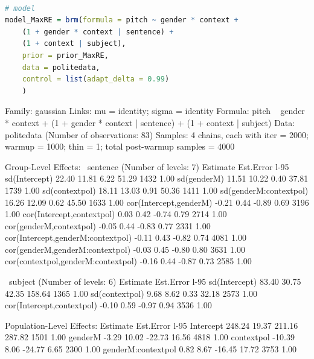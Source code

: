 \documentclass[nobib]{tufte-handout}
\begin{document}
\bigskip

\begin{minipage}[]{1\textwidth}
\begin{lstlisting}[language=R]

# model
model_MaxRE = brm(formula = pitch ~ gender * context +
	(1 + gender * context | sentence) +
	(1 + context | subject),
	prior = prior_MaxRE,
	data = politedata,
	control = list(adapt_delta = 0.99)
	)
\end{lstlisting}
\end{minipage}

\medskip

\begin{minipage}[]{1.5\textwidth}
\begin{rc}
Family: gaussian 
  Links: mu = identity; sigma = identity 
Formula: pitch ~ gender * context + (1 + gender * context | sentence) + (1 + context | subject) 
   Data: politedata (Number of observations: 83) 
Samples: 4 chains, each with iter = 2000; warmup = 1000; thin = 1;
         total post-warmup samples = 4000

Group-Level Effects: 
~sentence (Number of levels: 7) 
                                   Estimate Est.Error l-95%
sd(Intercept)                         22.40     11.81     6.22    51.29       1432 1.00
sd(genderM)                           11.51     10.22     0.40    37.81       1739 1.00
sd(contextpol)                        18.11     13.03     0.91    50.36       1411 1.00
sd(genderM:contextpol)                16.26     12.09     0.62    45.50       1633 1.00
cor(Intercept,genderM)                -0.21      0.44    -0.89     0.69       3196 1.00
cor(Intercept,contextpol)              0.03      0.42    -0.74     0.79       2714 1.00
cor(genderM,contextpol)               -0.05      0.44    -0.83     0.77       2331 1.00
cor(Intercept,genderM:contextpol)     -0.11      0.43    -0.82     0.74       4081 1.00
cor(genderM,genderM:contextpol)       -0.03      0.45    -0.80     0.80       3631 1.00
cor(contextpol,genderM:contextpol)    -0.16      0.44    -0.87     0.73       2585 1.00

~subject (Number of levels: 6) 
                          Estimate Est.Error l-95%
sd(Intercept)                83.40     30.75    42.35   158.64       1365 1.00
sd(contextpol)                9.68      8.62     0.33    32.18       2573 1.00
cor(Intercept,contextpol)    -0.10      0.59    -0.97     0.94       3536 1.00

Population-Level Effects: 
                   Estimate Est.Error l-95%
Intercept            248.24     19.37   211.16   287.82       1501 1.00
genderM               -3.29     10.02   -22.73    16.56       4818 1.00
contextpol           -10.39      8.06   -24.77     6.65       2300 1.00
genderM:contextpol     0.82      8.67   -16.45    17.72       3753 1.00


\end{rc}
\end{minipage}
\end{document}
